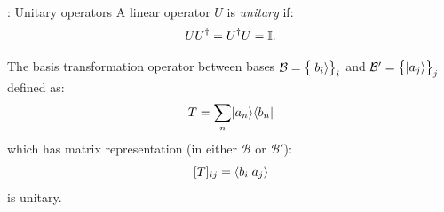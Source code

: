 \begin{defbox}{: Unitary operators}
    A linear operator $U$ is \emph{unitary} if:
    \begin{equation}
        UU^\dagger = U^\dagger U = \mathbb{I}.
    \end{equation}
\end{defbox}
\begin{thmbox}{}
    The basis transformation operator between bases $\mathcal{B} = \set{\lvert b_i \rangle}_i$ and $\mathcal{B}' = \set{\lvert a_j \rangle}_j$ defined as:
    \begin{equation}\label{eq-Tbasisagnostic}
        T = \sum_{n} \lvert a_n \rangle \langle b_n \rvert
    \end{equation}
    which has matrix representation (in either $\mathcal{B}$ or $\mathcal{B}'$):
    \begin{equation}\label{eq-Tmatrix}
        [T]_{ij} = \langle b_i \lvert a_j \rangle
    \end{equation}
    is unitary.
\end{thmbox}
